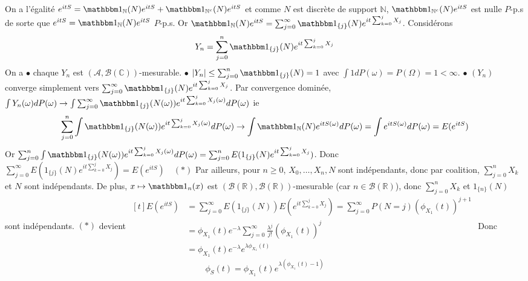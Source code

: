 \documentclass{report}
\begin{document}
\subsection{} \noindent{}\\ 
\\ 
\\
\noindent On a l'égalité $e^{itS}=\mathbbm 1_{\mathbb N}(N)e^{itS} +\mathbbm 1_{\mathbb N^c}(N)e^{itS}$ et comme $N$ est discrète de support $\mathbb N$, $\mathbbm 1_{\mathbb N^c}(N)e^{itS}$ est nulle $P$-p.s de sorte que $e^{itS}=\mathbbm 1_{\mathbb N}(N)e^{itS}$ $P$-p.s.\newline
Or $\mathbbm 1_{\mathbb N}(N)e^{itS}=\sum_{j=0}^\infty \mathbbm 1_{\{j\}}(N)e^{it\sum_{k=0}^j X_j}$.
Considérons $$Y_n=\sum_{j=0}^n \mathbbm 1_{\{j\}}(N)e^{it\sum_{k=0}^j X_j}$$
On a 
$\bullet$ chaque $Y_n$ est $(\mathcal A,\mathcal B(\mathbb C))$-mesurable. \newline
$\bullet$ $|Y_n|\leq \sum_{j=0}^n \mathbbm 1_{\{j\}}(N) = 1$ avec $\int 1 dP(\omega)= P(\Omega)=1<\infty$. \newline
$\bullet$ $(Y_n)$ converge simplement vers $\sum_{j=0}^\infty \mathbbm 1_{\{j\}}(N)e^{it\sum_{k=0}^j X_j}$. \newline
Par convergence dominée, $\int Y_n(\omega) dP(\omega) \to \int \sum_{j=0}^\infty \mathbbm 1_{\{j\}}(N(\omega))e^{it\sum_{k=0}^j X_j(\omega)} dP(\omega)$
ie $$\sum_{j=0}^n \int \mathbbm 1_{\{j\}}(N(\omega))e^{it\sum_{k=0}^j X_j(\omega)} dP(\omega)\to \int\mathbbm 1_{\mathbb N}(N)e^{itS(\omega)} dP(\omega) = \int e^{itS(\omega)}dP(\omega)=E(e^{itS})$$
Or $\sum_{j=0}^n \int \mathbbm 1_{\{j\}}(N(\omega))e^{it\sum_{k=0}^j X_j(\omega)} dP(\omega) = \sum_{j=0}^n E(1_{\{j\}}(N)e^{it\sum_{k=0}^j X_j})$.\newline
Donc $\sum_{j=0}^\infty E(1_{\{j\}}(N)e^{it\sum_{k=0}^j X_j})=E(e^{itS}) \quad (*)$
\newline
Par ailleurs, pour $n\geq 0$, $X_0,\ldots,X_n,N$ sont indépendants, donc par coalition, $\sum_{j=0}^n X_k$ et $N$ sont indépendants. De plus, $x\mapsto \mathbbm 1_{n}(x)$ est $(\mathcal B(\mathbb R), \mathcal B(\mathbb R))$-mesurable (car ${n}\in \mathcal B(\mathbb R)$), donc $\sum_{j=0}^n X_k$ et $1_{\{n\}}(N)$ sont indépendants. \newline
\newline 
$(*)$ devient $\begin{aligned}[t] E(e^{itS}) &= \sum_{j=0}^\infty E(1_{\{j\}}(N))E(e^{it\sum_{k=0}^j X_j}) = \sum_{j=0}^\infty P(N=j) (\phi_{X_1}(t))^{j+1}\\
&= \phi_{X_1}(t) e^{-\lambda} \sum_{j=0}^\infty  \frac{\lambda^j}{j!} (\phi_{X_1}(t))^{j}\\
&= \phi_{X_1}(t) e^{-\lambda} e^{\lambda\phi_{X_1}(t) }
\end{aligned}$\newline
Donc $$\phi_S(t)=\phi_{X_1}(t) e^{\lambda(\phi_{X_1}(t)-1) }$$
\end{document}
